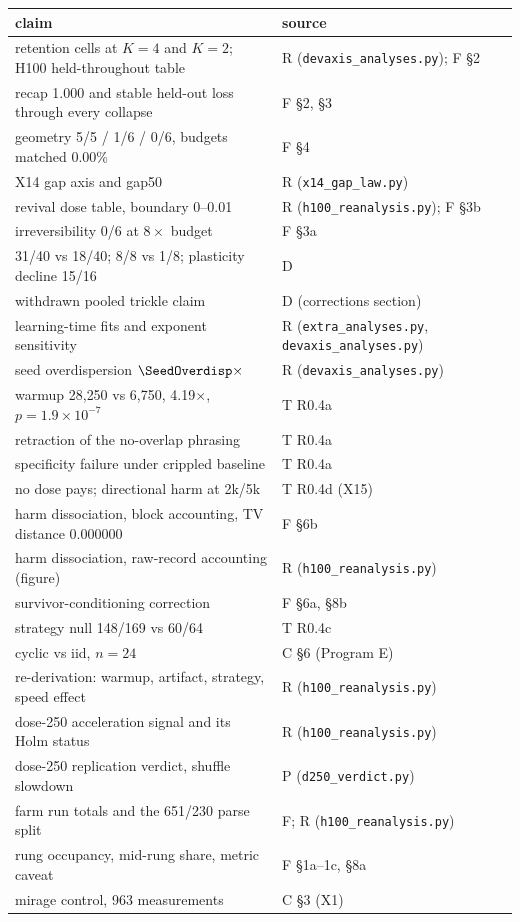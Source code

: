 \documentclass{article}
\begin{document}
\begin{center}
\scriptsize
\begin{tabular}{ll}
\hline
claim & source \\
\hline
retention cells at $K{=}4$ and $K{=}2$; H100 held-throughout table & R (\texttt{devaxis\_analyses.py}); F \S2 \\
recap 1.000 and stable held-out loss through every collapse & F \S2, \S3 \\
geometry 5/5 / 1/6 / 0/6, budgets matched 0.00\% & F \S4 \\
X14 gap axis and gap50 & R (\texttt{x14\_gap\_law.py}) \\
revival dose table, boundary 0--0.01 & R (\texttt{h100\_reanalysis.py}); F \S3b \\
irreversibility 0/6 at $8\times$ budget & F \S3a \\
31/40 vs 18/40; 8/8 vs 1/8; plasticity decline 15/16 & D \\
withdrawn pooled trickle claim & D (corrections section) \\
learning-time fits and exponent sensitivity & R (\texttt{extra\_analyses.py}, \texttt{devaxis\_analyses.py}) \\
seed overdispersion $\SeedOverdisp\times$ & R (\texttt{devaxis\_analyses.py}) \\
warmup 28{,}250 vs 6{,}750, 4.19$\times$, $p=1.9\times10^{-7}$ & T R0.4a \\
retraction of the no-overlap phrasing & T R0.4a \\
specificity failure under crippled baseline & T R0.4a \\
no dose pays; directional harm at 2k/5k & T R0.4d (X15) \\
harm dissociation, block accounting, TV distance 0.000000 & F \S6b \\
harm dissociation, raw-record accounting (figure) & R (\texttt{h100\_reanalysis.py}) \\
survivor-conditioning correction & F \S6a, \S8b \\
strategy null 148/169 vs 60/64 & T R0.4c \\
cyclic vs iid, $n=24$ & C \S6 (Program E) \\
re-derivation: warmup, artifact, strategy, speed effect & R (\texttt{h100\_reanalysis.py}) \\
dose-250 acceleration signal and its Holm status & R (\texttt{h100\_reanalysis.py}) \\
dose-250 replication verdict, shuffle slowdown & P (\texttt{d250\_verdict.py}) \\
farm run totals and the 651/230 parse split & F; R (\texttt{h100\_reanalysis.py}) \\
rung occupancy, mid-rung share, metric caveat & F \S1a--1c, \S8a \\
mirage control, 963 measurements & C \S3 (X1) \\
\hline
\end{tabular}
\end{center}
\end{document}
